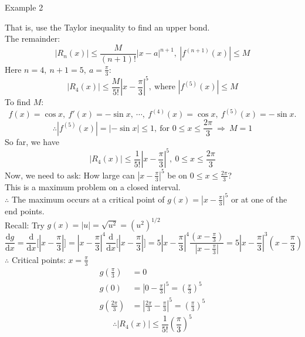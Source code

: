 \documentclass[12pt,a4paper]{article}
\def\d{{\mathrm{d}}}
\def\dx{\d x}
\begin{document}
\begin{eg}{Example 2}
\begin{enumerate}
		That is, use the Taylor inequality to find an upper bond. \\
		The remainder: $$|R_n(x)|\leq\frac{M}{(n+1)!}|x-a|^{n+1},\ |f^{(n+1)}(x)|\leq M$$
		Here $\displaystyle n=4,\ n+1=5,\ a=\frac{\pi}{3}$: 
		$$|R_4(x)|\leq\frac{M}{5!}\left|x-\frac{\pi}{3}\right|^5,\ \text{where }|f^{(5)}(x)|\leq M$$
		To find $M$: 
		$$f(x)=\cos{x},\ f'(x)=-\sin{x},\ \cdots,\ f^{(4)}(x)=\cos{x},\ f^{(5)}(x)=-\sin{x}.$$
		$$\therefore |f^{(5)}(x)|=|-\sin{x}|\leq1,\ \text{for }0\leq x\leq\frac{2\pi}{3}\ \Rightarrow\ M=1$$
		So far, we have $$|R_4(x)|\leq\frac{1}{5!}\left|x-\frac{\pi}{3}\right|^5,\ 0\leq x\leq\frac{2\pi}{3}$$
		Now, we need to ask: How large can $\displaystyle\left|x-\frac{\pi}{3}\right|^5$ be on $\displaystyle 0\leq x\leq\frac{2\pi}{3}$? \\
		This is a maximum problem on a closed interval. \\
		$\therefore$ The maximum occurs at a critical point of $\displaystyle g(x)=\left|x-\frac{\pi}{3}\right|^5$ or at one of the end points. \\
		Recall: Try $g(x)=|u|=\sqrt{u^2}=(u^2)^{1/2}$
		$$\frac{\d g}{\dx}=\frac{\d}{\dx}\bigg[\left|x-\frac{\pi}{3}\right|\bigg]=\left|x-\frac{\pi}{3}\right|^4\frac{\d}{\dx}\bigg[\left|x-\frac{\pi}{3}\right|\bigg]=5\left|x-\frac{\pi}{3}\right|^4\frac{(x-\frac{\pi}{3})}{\left|x-\frac{\pi}{3}\right|}=5\left|x-\frac{\pi}{3}\right|^3\left(x-\frac{\pi}{3}\right)$$
		$\therefore$ Critical points: $\displaystyle x=\frac{\pi}{3}$\\
		$$\begin{aligned}
			g\left(\frac{\pi}{3}\right)&=0\\
			g(0)&=\left|0-\frac{\pi}{3}\right|^5=\left(\frac{\pi}{3}\right)^5\\
			g\left(\frac{2\pi}{3}\right)&=\left|\frac{2\pi}{3}-\frac{\pi}{3}\right|^5=\left(\frac{\pi}{3}\right)^5
		\end{aligned}$$
		$$\therefore |R_4(x)|\leq\frac{1}{5!}\left(\frac{\pi}{3}\right)^5$$
	\end{enumerate}	
\end{eg}
\end{document}
